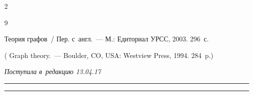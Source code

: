 \begin{multicols}{2}
{{\begin{thebibliography}{9}


 Теория графов~/ Пер. с~англ.~--- М.: Едиториал УРСС, 2003. 296~с.


( {Graph theory}.~--- Boulder, CO, USA: Westview Press, 1994. 284~p.)


 \end{thebibliography}





 }


 }





\end{multicols}





\vspace*{-6pt}





\hfill{\small\textit{Поступила в~редакцию 13.04.17}}





\vspace*{6pt}















\hrule





\vspace*{2pt}





\hrule













\def\tit{DISCRETE ANALYSIS IN~PARSING}





\def\titkol{Discrete analysis in~parsing}





